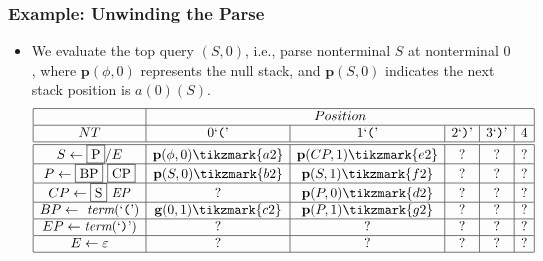 \documentclass[xcolor=dvipsnames]{beamer}
\begin{document}
\begin{frame}[fragile]
\frametitle{Example: Unwinding the Parse}
\begin{itemize}
\item We evaluate the top query $(S, 0)$, i.e., parse nonterminal $S$ at nonterminal $0$, where
$\mathbf{p}(\phi, 0)$ represents the null stack, and $\mathbf{p}(S, 0)$ indicates the next stack position is $a(0)(S)$\@.  
$$
\begin{array}[c]{|c|c|c|c|c|c|}\hline
  & \multicolumn{5}{c|}{Position} \\\hline
NT  & 0 \mbox{\lq\texttt{(}\rq}& 1 \mbox{\lq\texttt{(}\rq}& 2 \mbox{\lq\texttt{)}\rq}& 3 \mbox{\lq\texttt{)}\rq} & 4 \\\hline\hline
S \leftarrow  \fbox{P} / E &  \mathbf{p}(\phi, 0)\tikzmark{a2} & \mathbf{p}(CP, 1)\tikzmark{e2} & ? & ? & ? \\\hline
  P \leftarrow  {\mathit{\fbox{BP}}}~\mathit{\fbox{CP}}    &  \mathbf{p}(S, 0)\tikzmark{b2} & \mathbf{p}(S, 1)\tikzmark{f2} & ? & ? & ? \\\hline
  CP \leftarrow  \fbox{S}~\mathit{EP} &  ? & \mathbf{p}(P, 0)\tikzmark{d2} & ? & ? & ? \\\hline
  BP \leftarrow \textit{ term}(\mbox{\lq\texttt{(}\rq}) &  \mathbf{g}(0, 1)\tikzmark{c2} & \mathbf{p}(P, 1)\tikzmark{g2} & ? & ? & ? \\\hline
  EP \leftarrow  \textit{term}(\mbox{\lq\texttt{)}\rq}) &  ? & ? & ? & ? & ? \\\hline
  E \leftarrow  \varepsilon  & ? & ? & ? & ? & ? \\\hline    
\end{array}
$$
\end{itemize}
\end{frame}
\end{document}
